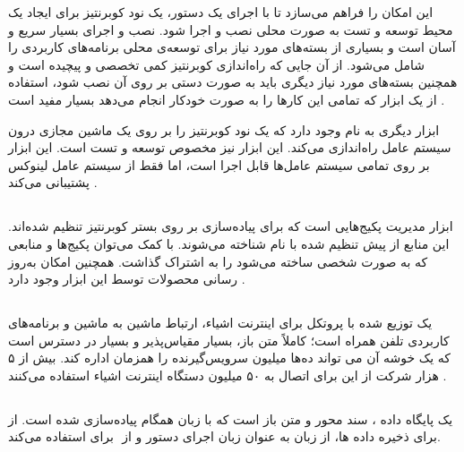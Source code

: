  این امکان را فراهم می‌سازد تا با اجرای یک دستور، یک نود کوبرنتیز برای ایجاد یک محیط توسعه و تست به صورت محلی نصب و اجرا شود. نصب و اجرای  بسیار سریع و آسان است و بسیاری از بسته‌های مورد نیاز برای توسعه‌ی محلی برنامه‌های کاربردی را شامل می‌شود. از آن جایی که راه‌اندازی کوبرنتیز کمی تخصصی و پیچیده است و همچنین بسته‌های مورد نیاز دیگری باید به صورت دستی بر روی آن نصب شود، استفاده از یک ابزار که تمامی این کارها را به صورت خودکار انجام می‌دهد بسیار مفید است \cite{microk8s}.

ابزار دیگری به نام  وجود دارد که یک نود کوبرنتیز را بر روی یک ماشین مجازی درون سیستم عامل راه‌اندازی می‌کند. این ابزار نیز مخصوص توسعه و تست است. این ابزار بر روی تمامی سیستم عامل‌ها قابل اجرا است، اما  فقط از سیستم عامل لینوکس پشتیبانی می‌کند \cite{minikube}.

\subsection{}

ابزار مدیریت پکیج‌هایی است که برای پیاده‌سازی بر روی بستر کوبرنتیز تنظیم شده‌اند. این منابع از پیش تنظیم شده با نام  شناخته می‌شوند. با کمک  می‌توان پکیج‌ها و منابعی که به صورت شخصی ساخته می‌شود را به اشتراک گذاشت. همچنین امکان به‌روز رسانی محصولات توسط این ابزار وجود دارد \cite{helm}.

\subsection{}

 یک  توزیع شده با پروتکل  برای اینترنت اشیاء، ارتباط ماشین به ماشین و برنامه‌های کاربردی تلفن همراه است؛ کاملاً متن باز، بسیار مقیاس‌پذیر و بسیار در دسترس است که یک خوشه آن می تواند ده‌ها میلیون سرویس‌گیرنده را همزمان اداره کند. بیش از ۵ هزار شرکت از این  برای اتصال به ۵۰ میلیون دستگاه اینترنت اشیاء استفاده می‌کنند \cite{emqx}.

\subsection{}

 یک پایگاه داده ، سند محور و متن باز است که با زبان همگام  پیاده‌سازی شده است. از  برای ذخیره داده ها، از زبان  به عنوان زبان اجرای دستور و از ‌ برای  استفاده می‌کند.

